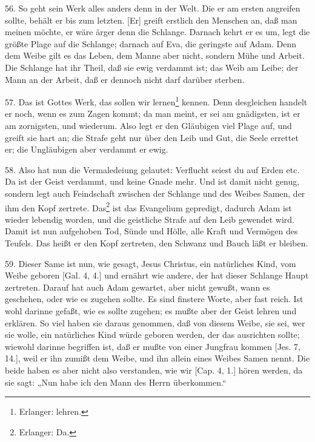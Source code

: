 56. So geht sein Werk alles anders denn in der Welt. Die er am ersten angreifen sollte, behält er bis zum letzten. [Er] greift erstlich den Menschen an, daß man meinen möchte, er wäre ärger denn die Schlange. Darnach kehrt er es um, legt die größte Plage auf die Schlange; darnach auf Eva, die geringste auf Adam. Denn dem Weibe gilt es das Leben, dem Manne aber nicht, sondern Mühe und Arbeit. Die Schlange hat ihr Theil, daß sie ewig verdammt ist; das Weib am Leibe; der Mann an der Arbeit, daß er dennoch nicht darf darüber sterben.

57. Das ist Gottes Werk, das sollen wir lernen\footnote{Erlanger: lehren.} kennen. Denn desgleichen handelt er noch, wenn es zum Zagen kommt; da man meint, er sei am gnädigsten, ist er am zornigsten, und wiederum. Also legt er den Gläubigen viel Plage auf, und greift sie hart an; die Strafe geht nur über den Leib und Gut, die Seele errettet er; die Ungläubigen aber verdammt er ewig.

58. Also hat nun die Vermaledeiung gelautet: Verflucht seiest du auf Erden etc. Da ist der Geist verdammt, und keine Gnade mehr. Und ist damit nicht genug, sondern legt auch Feindschaft zwischen der Schlange und des Weibes Samen, der ihm den Kopf zertrete. Das\footnote{Erlanger: Da.} ist das Evangelium gepredigt, dadurch Adam ist wieder lebendig worden, und die geistliche Strafe auf den Leib gewendet wird. Damit ist nun aufgehoben Tod, Sünde und Hölle, alle Kraft und Vermögen des Teufels. Das heißt er den Kopf zertreten, den Schwanz und Bauch läßt er bleiben.

59. Dieser Same ist nun, wie gesagt, Jesus Christus, ein natürliches Kind, vom Weibe geboren [Gal. 4, 4.] und ernährt wie andere, der hat dieser Schlange Haupt zertreten. Darauf hat auch Adam gewartet, aber nicht gewußt, wann es geschehen, oder wie es zugehen sollte. Es sind finstere Worte, aber fast reich. Ist wohl darinne gefaßt, wie es sollte zugehen; es mußte aber der Geist lehren und erklären. So viel haben sie daraus genommen, daß von diesem Weibe, sie sei, wer sie wolle, ein natürliches Kind würde geboren werden, der das ausrichten sollte; wiewohl darinne begriffen ist, daß er mußte von einer Jungfrau kommen [Jes. 7, 14.], weil er ihn zumißt dem Weibe, und ihn allein eines Weibes Samen nennt. Die beide haben es aber nicht also verstanden, wie wir [Cap. 4, 1.] hören werden, da sie sagt: „Nun habe ich den Mann des Herrn überkommen.“

